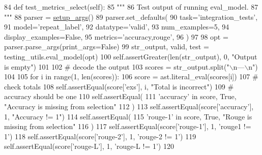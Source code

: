 \begin{DoxyCode}
84     \textcolor{keyword}{def }test\_metrics\_select(self):
85         \textcolor{stringliteral}{"""}
86 \textcolor{stringliteral}{        Test output of running eval\_model.}
87 \textcolor{stringliteral}{        """}
88         parser = \hyperlink{namespaceparlai_1_1chat__service_1_1services_1_1messenger_1_1run_a17bafea2534d593de1fbf1e0724e5b67}{setup\_args}()
89         parser.set\_defaults(
90             task=\textcolor{stringliteral}{'integration\_tests'},
91             model=\textcolor{stringliteral}{'repeat\_label'},
92             datatype=\textcolor{stringliteral}{'valid'},
93             num\_examples=5,
94             display\_examples=\textcolor{keyword}{False},
95             metrics=\textcolor{stringliteral}{'accuracy,rouge'},
96         )
97 
98         opt = parser.parse\_args(print\_args=\textcolor{keyword}{False})
99         str\_output, valid, test = testing\_utils.eval\_model(opt)
100         self.assertGreater(len(str\_output), 0, \textcolor{stringliteral}{"Output is empty"})
101 
102         \textcolor{comment}{# decode the output}
103         scores = str\_output.split(\textcolor{stringliteral}{"\(\backslash\)n---\(\backslash\)n"})
104 
105         \textcolor{keywordflow}{for} i \textcolor{keywordflow}{in} range(1, len(scores)):
106             score = ast.literal\_eval(scores[i])
107             \textcolor{comment}{# check totals}
108             self.assertEqual(score[\textcolor{stringliteral}{'exs'}], i, \textcolor{stringliteral}{"Total is incorrect"})
109             \textcolor{comment}{# accuracy should be one}
110             self.assertEqual(
111                 \textcolor{stringliteral}{'accuracy'} \textcolor{keywordflow}{in} score, \textcolor{keyword}{True}, \textcolor{stringliteral}{"Accuracy is missing from selection"}
112             )
113             self.assertEqual(score[\textcolor{stringliteral}{'accuracy'}], 1, \textcolor{stringliteral}{"Accuracy != 1"})
114             self.assertEqual(
115                 \textcolor{stringliteral}{'rouge-1'} \textcolor{keywordflow}{in} score, \textcolor{keyword}{True}, \textcolor{stringliteral}{"Rouge is missing from selection"}
116             )
117             self.assertEqual(score[\textcolor{stringliteral}{'rouge-1'}], 1, \textcolor{stringliteral}{'rouge1 != 1'})
118             self.assertEqual(score[\textcolor{stringliteral}{'rouge-2'}], 1, \textcolor{stringliteral}{'rouge-2 != 1'})
119             self.assertEqual(score[\textcolor{stringliteral}{'rouge-L'}], 1, \textcolor{stringliteral}{'rouge-L != 1'})
120 
\end{DoxyCode}
\mbox{\label{classtests_1_1test__eval__model_1_1TestEvalModel_a06987267bf1d5f021f3ddcbe489a820f}} 
